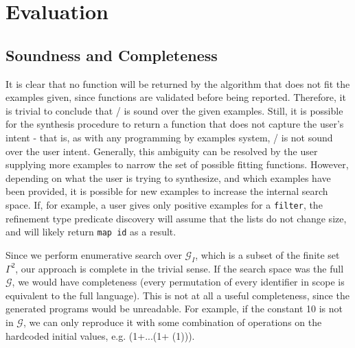 \section{Evaluation}\label{evaluation}

\subsection{Soundness and Completeness}\label{sound}

It is clear that no function will be returned by the algorithm that does not fit the examples given, since functions are validated before being reported.
Therefore, it is trivial to conclude that \ourTool/ is sound over the given examples.
Still, it is possible for the synthesis procedure to return a function that does not capture the user's intent - that is, as with any programming by examples system, \ourTool/ is not sound over the user intent.
Generally, this ambiguity can be resolved by the user supplying more examples to narrow the set of possible fitting functions.
However, depending on what the user is trying to synthesize, and which examples have been provided, it is possible for new examples to increase the internal search space.
If, for example, a user gives only positive examples for a \texttt{filter}, the refinement type predicate discovery will assume that the lists do not change size, and will likely return \texttt{map id} as a result.

Since we perform enumerative search over $\mathcal{G}_I$, which is a subset of the finite set $\Gamma^2$, our approach is complete in the trivial sense. 
If the search space was the full $\mathcal{G}$, we would have completeness (every permutation of every identifier in scope is equivalent to the full language).
This is not at all a useful completeness, since the generated programs would be unreadable.
For example, if the constant 10 is not in $\mathcal{G}$, we can only reproduce it with some combination of operations on the hardcoded initial values, e.g. (1+...(1+ (1))).





